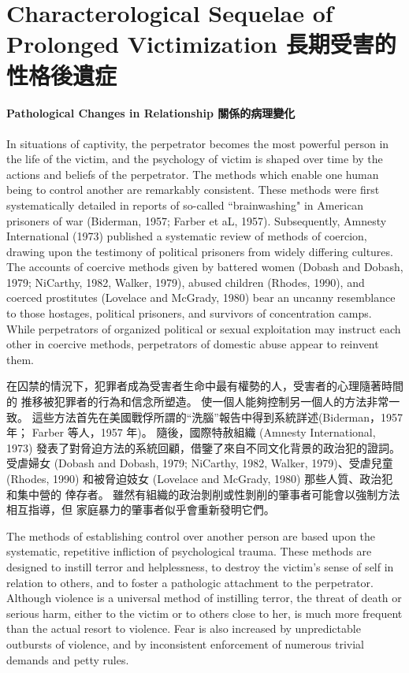 \documentclass[12pt]{article}
\begin{document}
\section{Characterological Sequelae of Prolonged Victimization
長期受害的性格後遺症}

\paragraph{Pathological Changes in Relationship 關係的病理變化}
    In situations of captivity, the perpetrator becomes the most powerful
    person in the life of the victim, and the psychology of victim is shaped
    over time by the actions and beliefs of the perpetrator. The methods which
    enable one human being to control another are remarkably consistent. These
    methods were first systematically detailed in reports of so-called
    ``brainwashing" in American prisoners of war (Biderman, 1957; Farber et aL,
    1957). Subsequently, Amnesty International (1973) published a systematic
    review of methods of coercion, drawing upon the testimony of political
    prisoners from widely differing cultures. The accounts of coercive methods
    given by battered women (Dobash and Dobash, 1979; NiCarthy, 1982, Walker,
    1979), abused children (Rhodes, 1990), and coerced prostitutes (Lovelace
    and McGrady, 1980) bear an uncanny resemblance to those hostages, political
    prisoners, and survivors of concentration camps. While perpetrators of
    organized political or sexual exploitation may instruct each other in
    coercive methods, perpetrators of domestic abuse appear to reinvent them.

    在囚禁的情況下，犯罪者成為受害者生命中最有權勢的人，受害者的心理隨著時間的
    推移被犯罪者的行為和信念所塑造。 使一個人能夠控制另一個人的方法非常一致。
    這些方法首先在美國戰俘所謂的“洗腦”報告中得到系統詳述(Biderman，1957 年；
    Farber 等人，1957 年)。 隨後，國際特赦組織 (Amnesty International, 1973)
    發表了對脅迫方法的系統回顧，借鑒了來自不同文化背景的政治犯的證詞。 受虐婦女
    (Dobash and Dobash, 1979; NiCarthy, 1982, Walker, 1979)、受虐兒童 (Rhodes,
    1990) 和被脅迫妓女 (Lovelace and McGrady, 1980) 那些人質、政治犯和集中營的
    倖存者。 雖然有組織的政治剝削或性剝削的肇事者可能會以強制方法相互指導，但
    家庭暴力的肇事者似乎會重新發明它們。

    The methods of establishing control over another person are based upon the
    systematic, repetitive infliction of psychological trauma. These methods
    are designed to instill terror and helplessness, to destroy the victim's
    sense of self in relation to others, and to foster a pathologic attachment
    to the perpetrator. Although violence is a universal method of instilling
    terror, the threat of death or serious harm, either to the victim or to
    others close to her, is much more frequent than the actual resort to
    violence. Fear is also increased by unpredictable outbursts of violence,
    and by inconsistent enforcement of numerous trivial demands and petty
    rules.
\end{document}
